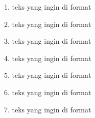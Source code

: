 
1. {\tiny teks yang ingin di format}

2. {\scriptsize teks yang ingin di format}

3. {\footnotesize teks yang ingin di format}

4. {\small teks yang ingin di format}

5. {\normalsize teks yang ingin di format}

6. {\large teks yang ingin di format}

7. {\huge teks yang ingin di format}
